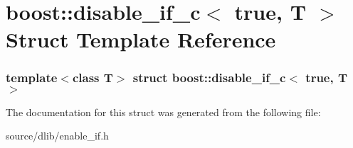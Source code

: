 \hypertarget{structboost_1_1disable__if__c_3_01true_00_01T_01_4}{
\section{boost::disable\_\-if\_\-c$<$ true, T $>$ Struct Template Reference}
\label{structboost_1_1disable__if__c_3_01true_00_01T_01_4}
}
\subsubsection*{template$<$class T$>$ struct boost::disable\_\-if\_\-c$<$ true, T $>$}



The documentation for this struct was generated from the following file:\begin{DoxyCompactItemize}
\item 
source/dlib/enable\_\-if.h\end{DoxyCompactItemize}
